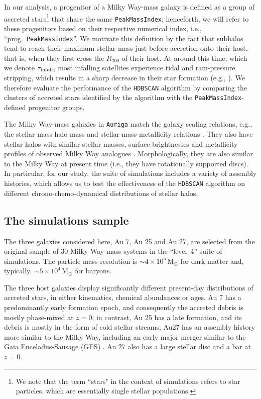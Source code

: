 In our analysis, a progenitor of a Milky Way-mass galaxy is defined as a group of accreted stars\footnote{We note that the term ``stars" in the context of simulations refers to star particles, which are essentially single stellar populations.} that share the same \texttt{PeakMassIndex}; henceforth, we will refer to these progenitors based on their respective numerical index, i.e., ``prog.~\texttt{PeakMassIndex}''. We motivate this definition by the fact that subhalos tend to reach their maximum stellar mass just before accretion onto their host, that is, when they first cross the $R_{200}$ of their host. At around this time, which we denote $\tau_{\rm infall}$, most infalling satellites experience tidal and ram-pressure stripping, which results in a sharp decrease in their star formation (e.g., \citealt{Kawata2008,Simpson2018,Font2022}). We therefore evaluate the performance of the \texttt{HDBSCAN} algorithm by comparing the clusters of accreted stars identified by the algorithm with the \texttt{PeakMassIndex}-defined progenitor groups.

The Milky Way-mass galaxies in \texttt{Auriga} match the galaxy scaling relations, e.g., the stellar mass-halo mass and stellar mass-metallicity relations \citep{Grand2017}. They also have stellar halos with similar stellar masses, surface brightnesses and metallicity profiles of observed Milky Way analogues \citep{Monachesi2019}. Morphologically, they are also similar to the Milky Way at present time (i.e., they have rotationally supported discs). In particular, for our study, the suite of simulations includes a variety of assembly histories, which allows us to test the effectiveness of the \texttt{HDBSCAN} algorithm on different chrono-chemo-dynamical distributions of stellar halos.

\subsection{The simulations sample}
\label{sec:sims_sample}

The three galaxies considered here, Au 7, Au 25 and Au 27, are selected from the original sample of $30$ Milky Way-mass systems in the ``level~4'' suite of simulations. The particle mass resolution is $\sim 4 \times 10^{5}\, \mathrm{M}_{\odot}$ for dark matter and, typically, $\sim 5 \times 10^{4} \, \mathrm{M}_{\odot}$ for baryons.  

The three host galaxies display significantly different present-day distributions of accreted stars, in either kinematics, chemical abundances or ages. Au 7 has a predominantly early formation epoch, and consequently the accreted debris is mostly phase-mixed at $z=0$; in contrast, Au 25 has a late formation, and its debris is mostly in the form of cold stellar streams; Au27 has an assembly history more similar to the Milky Way, including an early major merger similar to the Gaia Enceladus-Sausage (GES) \citep{Fattahi2019}. Au 27 also has a large stellar disc and a bar at $z=0$. 

